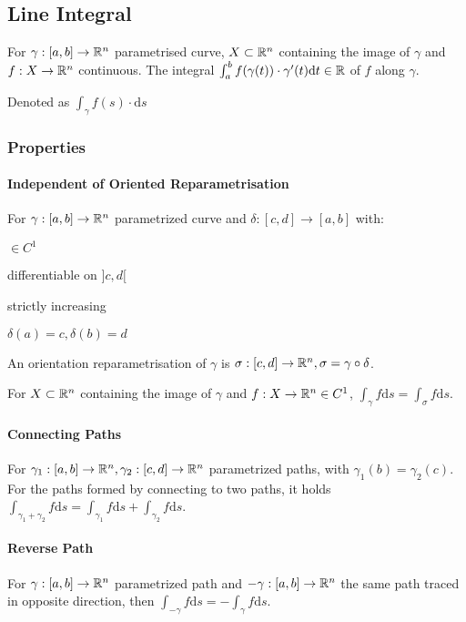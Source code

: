 \subsection{Line Integral}
For $\gamma: [a, b] \to \mathbb{R}^n$ parametrised curve, $X \subset \mathbb{R}^n$ containing the image of $\gamma$ and $f: X \to \mathbb{R}^n$ continuous. The integral $\int_{a}^{b} f(\gamma(t)) \cdot \gamma'(t) \mathrm{d}t \in \mathbb{R}$ of $f$ along $\gamma$.

\begin{compactitem}
    \item Denoted as $\int_{\gamma} f(s) \cdot \mathrm{d}s$
\end{compactitem}

\subsubsection{Properties}

\paragraph{Independent of Oriented Reparametrisation}
For $\gamma: [a, b] \to \mathbb{R}^n$ parametrized curve and $\delta: [c, d] \to [a, b]$ with:
\begin{inparaitem}
    \item $\in C^1$
    \item differentiable on $]c, d[$
    \item strictly increasing
    \item $\delta(a) = c, \delta(b) = d$
\end{inparaitem}
An orientation reparametrisation of $\gamma$ is $\sigma: [c, d] \to \mathbb{R}^n, \sigma = \gamma \circ \delta$.

For $X \subset \mathbb{R}^n$ containing the image of $\gamma$ and $f: X \to \mathbb{R}^n \in C^1$, $\int_{\gamma} f \mathrm{d}s = \int_{\sigma} f \mathrm{d}s$.

\paragraph{Connecting Paths}
For $\gamma_1: [a, b] \to \mathbb{R}^n, \gamma_2: [c, d] \to \mathbb{R}^n$ parametrized paths, with $\gamma_1(b) = \gamma_2(c)$. For the paths formed by connecting to two paths, it holds $\int_{\gamma_1 + \gamma_2} f \mathrm{d}s = \int_{\gamma_1} f \mathrm{d}s + \int_{\gamma_2} f \mathrm{d}s$.

\paragraph{Reverse Path}
For $\gamma: [a, b] \to \mathbb{R}^n$ parametrized path and $- \gamma:[a, b] \to \mathbb{R}^n$ the same path traced in opposite direction, then $\int_{-\gamma} f \mathrm{d}s = - \int_{\gamma} f \mathrm{d}s$.


